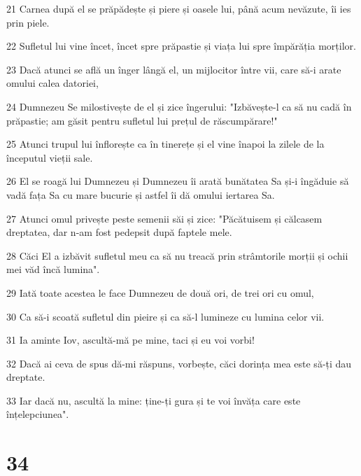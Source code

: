 \par 21 Carnea după el se prăpădește și piere și oasele lui, până acum nevăzute, îi ies prin piele.
\par 22 Sufletul lui vine încet, încet spre prăpastie și viața lui spre împărăția morților.
\par 23 Dacă atunci se află un înger lângă el, un mijlocitor între vii, care să-i arate omului calea datoriei,
\par 24 Dumnezeu Se milostivește de el și zice îngerului: "Izbăvește-l ca să nu cadă în prăpastie; am găsit pentru sufletul lui prețul de răscumpărare!"
\par 25 Atunci trupul lui înflorește ca în tinerețe și el vine înapoi la zilele de la începutul vieții sale.
\par 26 El se roagă lui Dumnezeu și Dumnezeu îi arată bunătatea Sa și-i îngăduie să vadă fața Sa cu mare bucurie și astfel îi dă omului iertarea Sa.
\par 27 Atunci omul privește peste semenii săi și zice: "Păcătuisem și călcasem dreptatea, dar n-am fost pedepsit după faptele mele.
\par 28 Căci El a izbăvit sufletul meu ca să nu treacă prin strâmtorile morții și ochii mei văd încă lumina".
\par 29 Iată toate acestea le face Dumnezeu de două ori, de trei ori cu omul,
\par 30 Ca să-i scoată sufletul din pieire și ca să-l lumineze cu lumina celor vii.
\par 31 Ia aminte Iov, ascultă-mă pe mine, taci și eu voi vorbi!
\par 32 Dacă ai ceva de spus dă-mi răspuns, vorbește, căci dorința mea este să-ți dau dreptate.
\par 33 Iar dacă nu, ascultă la mine: ține-ți gura și te voi învăța care este înțelepciunea".

\chapter{34}

